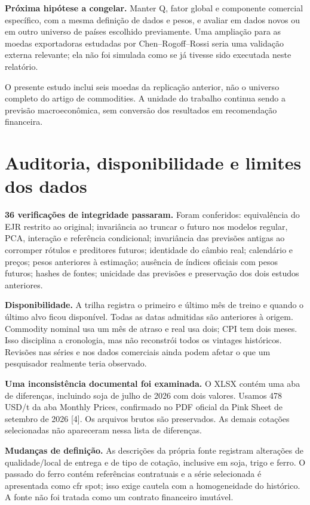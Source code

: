 \documentclass[11pt,a4paper]{article}
\begin{document}
\textbf{Próxima hipótese a congelar.} Manter Q, fator global e componente comercial específico, com a mesma definição de dados e pesos, e avaliar em dados novos ou em outro universo de países escolhido previamente. Uma ampliação para as moedas exportadoras estudadas por Chen--Rogoff--Rossi seria uma validação externa relevante; ela não foi simulada como se já tivesse sido executada neste relatório.

O presente estudo inclui seis moedas da replicação anterior, não o universo completo do artigo de commodities. A unidade do trabalho continua sendo a previsão macroeconômica, sem conversão dos resultados em recomendação financeira.

\clearpage
\section*{Auditoria, disponibilidade e limites dos dados}\textbf{36 verificações de integridade passaram.} 
Foram conferidos: equivalência do EJR restrito ao original; invariância ao truncar o futuro nos modelos regular, PCA, interação e referência condicional; invariância das previsões antigas ao corromper rótulos e preditores futuros; identidade do câmbio real; calendário e preços; pesos anteriores à estimação; ausência de índices oficiais com pesos futuros; hashes de fontes; unicidade das previsões e preservação dos dois estudos anteriores.

\textbf{Disponibilidade.} A trilha registra o primeiro e último mês de treino e quando o último alvo ficou disponível. Todas as datas admitidas são anteriores à origem. Commodity nominal usa um mês de atraso e real usa dois; CPI tem dois meses. Isso disciplina a cronologia, mas não reconstrói todos os vintages históricos. Revisões nas séries e nos dados comerciais ainda podem afetar o que um pesquisador realmente teria observado.

\textbf{Uma inconsistência documental foi examinada.} O XLSX contém uma aba de diferenças, incluindo soja de julho de 2026 com dois valores. Usamos 478 USD/t da aba Monthly Prices, confirmado no PDF oficial da Pink Sheet de setembro de 2026 [4]. Os arquivos brutos são preservados. As demais cotações selecionadas não apareceram nessa lista de diferenças.

\textbf{Mudanças de definição.} As descrições da própria fonte registram alterações de qualidade/local de entrega e de tipo de cotação, inclusive em soja, trigo e ferro. O passado do ferro contém referências contratuais e a série selecionada é apresentada como cfr spot; isso exige cautela com a homogeneidade do histórico. A fonte não foi tratada como um contrato financeiro imutável.
\end{document}
